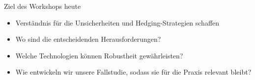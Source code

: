 \documentclass[10pt,aspectratio=169,dvipsnames]{beamer}
\begin{document}
\begin{frame}{Ziel des Workshops heute}
	\begin{itemize}
		\item Verständnis für die Unsicherheiten und Hedging-Strategien schaffen
		\item Wo sind die \alert{entscheidenden Herausforderungen}?
		\item Welche Technologien können Robustheit gewährleisten?
		\item Wie entwickeln wir unsere Fallstudie, sodass sie für die Praxis relevant bleibt?
	\end{itemize}

\end{frame}
\end{document}
